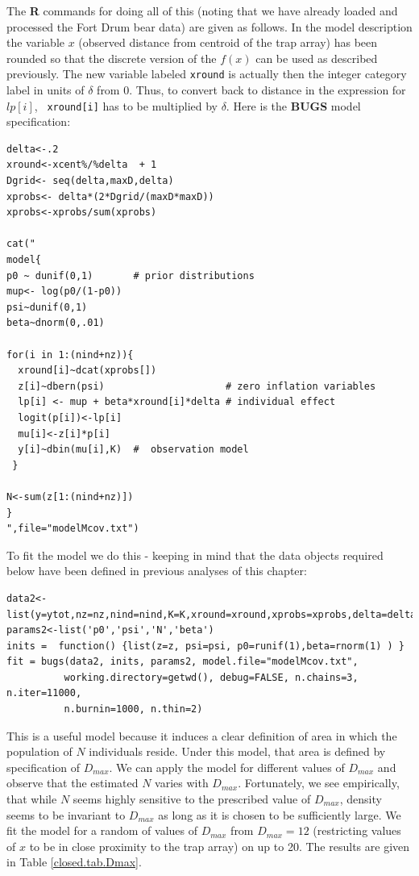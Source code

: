 The {\bf R} commands for doing all of this (noting that we have already loaded and processed
the Fort Drum bear data) are given  as follows. In the model description the
variable $x$ (observed distance from centroid of the trap array) has been rounded so that the
discrete version of the $f(x)$ can be used as described
previously. The new variable labeled \mbox{\tt xround} is actually
then the integer category label in units of $\delta$ from 0. Thus, to
convert back to distance in the expression for $lp[i]$, \mbox{\tt
  xround[i]} has to be multiplied by $\delta$. Here is the {\bf BUGS} model 
  specification:
{\small
\begin{verbatim}
delta<-.2
xround<-xcent%/%delta  + 1
Dgrid<- seq(delta,maxD,delta)
xprobs<- delta*(2*Dgrid/(maxD*maxD))
xprobs<-xprobs/sum(xprobs)

cat("
model{
p0 ~ dunif(0,1)       # prior distributions
mup<- log(p0/(1-p0))
psi~dunif(0,1)
beta~dnorm(0,.01)

for(i in 1:(nind+nz)){
  xround[i]~dcat(xprobs[])
  z[i]~dbern(psi)                     # zero inflation variables
  lp[i] <- mup + beta*xround[i]*delta # individual effect
  logit(p[i])<-lp[i]
  mu[i]<-z[i]*p[i]
  y[i]~dbin(mu[i],K)  #  observation model
 }

N<-sum(z[1:(nind+nz)])
}
",file="modelMcov.txt")
\end{verbatim}
}

To fit the model we do this - keeping in mind that the data objects
required below have been defined in previous analyses of this chapter:
{\small
\begin{verbatim}
data2<-list(y=ytot,nz=nz,nind=nind,K=K,xround=xround,xprobs=xprobs,delta=delta)
params2<-list('p0','psi','N','beta')
inits =  function() {list(z=z, psi=psi, p0=runif(1),beta=rnorm(1) ) }
fit = bugs(data2, inits, params2, model.file="modelMcov.txt",
          working.directory=getwd(), debug=FALSE, n.chains=3, n.iter=11000, 
          n.burnin=1000, n.thin=2)
\end{verbatim}
}

This is a useful model because it induces a clear definition of area
in which the population of $N$ individuals reside. Under this model,
that area is defined by specification of $D_{max}$. We can apply the model
for different values of $D_{max}$ and observe that the estimated $N$ varies
with $D_{max}$. Fortunately, we see empirically, that while $N$ seems
highly sensitive to the prescribed value of $D_{max}$, density seems to
be invariant to $D_{max}$ as long as it is chosen to be sufficiently
large. We fit the model for a random of values of $D_{max}$ from $D_{max}=12$ (restricting
values of $x$ to be in close proximity to
the trap array) on up to 20. The results are given in Table
\ref{closed.tab.Dmax}.


